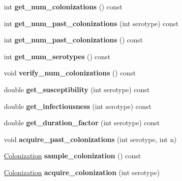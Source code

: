 \begin{DoxyCompactItemize}
\mbox{\label{class_host_a10354097068db8cf21d37484ea5fce83}} 
int {\bfseries get\+\_\+num\+\_\+colonizations} () const
\item 
\mbox{\label{class_host_af9ba19474bf1c997bf45ec99deab469d}} 
int {\bfseries get\+\_\+num\+\_\+past\+\_\+colonizations} (int serotype) const
\item 
\mbox{\label{class_host_ac3b2c4aa559d6c2484392bbc41acc336}} 
int {\bfseries get\+\_\+num\+\_\+past\+\_\+colonizations} () const
\item 
\mbox{\label{class_host_a6f1f9314c6ee49a860bece6a8f492d9a}} 
int {\bfseries get\+\_\+num\+\_\+serotypes} () const
\item 
\mbox{\label{class_host_a363ca1e5112f127fda71f9a45f3cf551}} 
void {\bfseries verify\+\_\+num\+\_\+colonizations} () const
\item 
\mbox{\label{class_host_ae315e3f03e57780e7944812568ab1649}} 
double {\bfseries get\+\_\+susceptibility} (int serotype) const
\item 
\mbox{\label{class_host_a12b6c482c793650dc6a50be41fdbc181}} 
double {\bfseries get\+\_\+infectiousness} (int serotype) const
\item 
\mbox{\label{class_host_aec45cad9f2784714cd7af0c4f5cf9640}} 
double {\bfseries get\+\_\+duration\+\_\+factor} (int serotype) const
\item 
\mbox{\label{class_host_a2c7466e4ab5466be7cea79ca464c99c1}} 
void {\bfseries acquire\+\_\+past\+\_\+colonizations} (int serotype, int n)
\item 
\mbox{\label{class_host_a90b244d215650ffae95718d01e97620a}} 
\hyperlink{class_colonization}{Colonization} {\bfseries sample\+\_\+colonization} () const
\item 
\mbox{\label{class_host_a6fd8397fa4117c475d9a0251228ceb8c}} 
\hyperlink{class_colonization}{Colonization} {\bfseries acquire\+\_\+colonization} (int serotype)
\item 

\end{DoxyCompactItemize}
